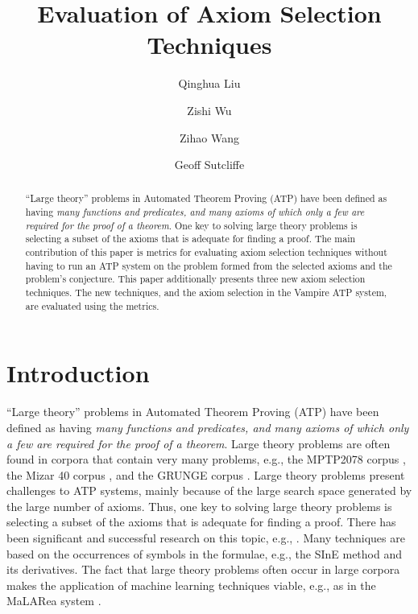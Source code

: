 \documentclass[EPiC]{easychair}
\title{Evaluation of Axiom Selection Techniques}
\author{
Qinghua Liu\inst{1}
 \and
Zishi Wu\inst{2}
 \and
Zihao Wang\inst{2}
 \and
Geoff Sutcliffe\inst{2}
}
\institute{
  Southwest Jiaotong University, China, \email{qhliu@my.swjtu.edu.cn}
\and
   University of Miami, USA, \email{zishi@cs.miami.edu,zxw526@miami.edu,geoff@cs.miami.edu}
 }
\begin{document}
\maketitle
\begin{abstract}
``Large theory'' problems in Automated Theorem Proving (ATP) have been
defined as having {\em many functions and predicates, and many axioms of
which only a few are required for the proof of a theorem}.
One key to solving large theory problems is selecting a subset of the axioms
that is adequate for finding a proof.
The main contribution of this paper is metrics for evaluating axiom selection 
techniques without having to run an ATP system on the problem formed from 
the selected axioms and the problem's conjecture.
This paper additionally presents three new axiom selection techniques.
The new techniques, and the axiom selection in the Vampire ATP 
system, are evaluated using the metrics.
\end{abstract}
\section{Introduction}
\label{Introduction}

``Large theory'' problems in Automated Theorem Proving (ATP) have been 
defined \cite{Sut20-CASC} as having {\em many functions and predicates, and 
many axioms of which only a few are required for the proof of a theorem}.
Large theory problems are often found in corpora that contain very many
problems, e.g., the MPTP2078 corpus \cite{AH+14}, the Mizar 40 corpus
\cite{KU15-M40}, and the GRUNGE corpus \cite{BG+19}.
Large theory problems present challenges to ATP systems, mainly because of the
large search space generated by the large number of axioms.
Thus, one key to solving large theory problems is selecting a subset of the 
axioms that is adequate for finding a proof. 
There has been significant and successful research on this topic, e.g.,
\cite{PSZG04,SP07,MP09,KC+10,HV11,Kv+12,AH+14,GK15,PU18}.
Many techniques are based on the occurrences of symbols in the formulae,
e.g., the SInE method \cite{HV11} and its derivatives. 
The fact that large theory problems often occur in large corpora makes the
application of machine learning techniques \cite{KB14} viable, e.g., as 
in the MaLARea system \cite{US+08}.
\end{document}
